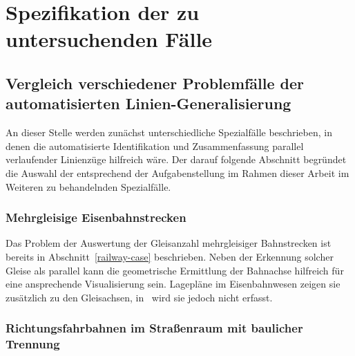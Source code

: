 \documentclass[../main/thesis.tex]{subfiles}
\begin{document}
\chapter{Spezifikation der zu untersuchenden Fälle}




\section[Vergleich verschiedener Fälle der automatisierten Linien-Generalisierung]{Vergleich verschiedener Problemfälle der au\-to\-ma\-ti\-sier\-ten Linien-Ge\-ne\-ra\-li\-sie\-rung}
\label{ch:case-comparison}


An dieser Stelle werden zunächst unterschiedliche Spezialfälle beschrieben, in denen die automatisierte Identifikation und Zusammenfassung parallel verlaufender Linienzüge hilfreich wäre.
Der darauf folgende Abschnitt begründet die Auswahl der entsprechend der Aufgabenstellung im Rahmen dieser Arbeit im Weiteren zu behandelnden Spezialfälle.


\subsection{Mehrgleisige Eisenbahnstrecken}

Das Problem der Auswertung der Gleisanzahl mehrgleisiger Bahnstrecken ist bereits in Abschnitt~\ref{railway-case} beschrieben.
Neben der Erkennung solcher Gleise als parallel kann die geometrische Ermittlung der Bahnachse hilfreich für eine ansprechende Visualisierung sein.
Lagepläne im Eisenbahnwesen zeigen sie zusätzlich zu den Gleisachsen, in \osm\ wird sie jedoch nicht erfasst.



\subsection{Richtungsfahrbahnen im Straßenraum mit baulicher Trennung}
\label{ch:dual-highway-case-desc}
\end{document}
